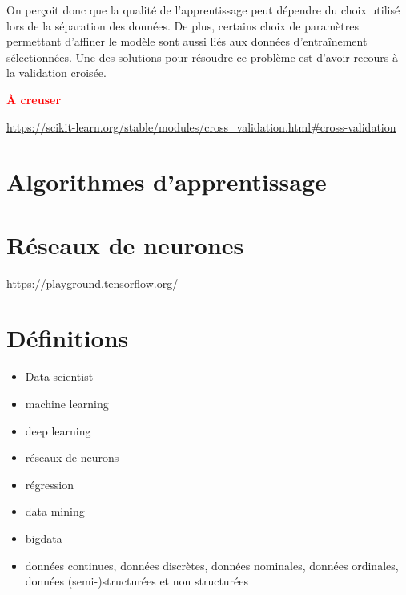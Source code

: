 On perçoit donc que la qualité de l'apprentissage peut dépendre du choix utilisé lors de la séparation des données. De plus, certains choix de paramètres permettant d’affiner le modèle sont aussi liés aux données d’entraînement sélectionnées. 
Une des solutions pour résoudre ce problème est d'avoir recours à la validation croisée. 

\textcolor{red}{\textbf{À creuser}}



\url{https://scikit-learn.org/stable/modules/cross_validation.html#cross-validation}





\newpage

\section{Algorithmes d'apprentissage}

\section{Réseaux de neurones}

\url{https://playground.tensorflow.org/}



\section{Définitions}

\begin{itemize}
\item Data scientist
\item machine learning
\item deep learning
\item réseaux de neurons
\item régression
\item data mining
\item bigdata
\item données continues, données discrètes, données nominales, données ordinales, données (semi-)structurées et non structurées

\end{itemize}


